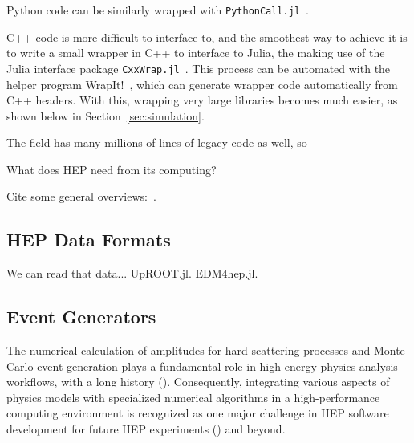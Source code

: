 \documentclass{webofc}
\begin{document}
Python code can be similarly wrapped with
\texttt{PythonCall.jl}~\cite{PythonCall.jl}.

C++ code is more difficult to interface to, and the smoothest way to achieve it
is to write a small wrapper in C++ to interface to Julia, the making use of the
Julia interface package \texttt{CxxWrap.jl}~\cite{CxxWrap.jl}. This process can
be automated with the helper program WrapIt!~\cite{wrapit-github}, which can
generate wrapper code automatically from C++ headers. With this, wrapping very
large libraries becomes much easier, as shown below in
Section~\ref{sec:simulation}.


The
field has many millions of lines of legacy code as well, so 

What does HEP need from its computing?

Cite some general overviews:~\cite{Stanitzki:2020bnx,eschle2023potential}.

\subsection{HEP Data Formats}

We can read that data... UpROOT.jl. EDM4hep.jl.

\subsection{Event Generators}

The numerical calculation of amplitudes for hard scattering processes and Monte
Carlo event generation plays a fundamental role in high-energy physics analysis
workflows, with a long history (\cite{campbell2024event}). Consequently,
integrating various aspects of physics models with specialized numerical
algorithms in a high-performance computing environment is recognized as one
major challenge in HEP software development for future HEP experiments
(\cite{HEPSoftwareFoundation:2017ggl, HSFPhysicsEventGeneratorWG:2020gxw,
HSFPhysicsEventGeneratorWG:2021xti}) and beyond.
\end{document}
